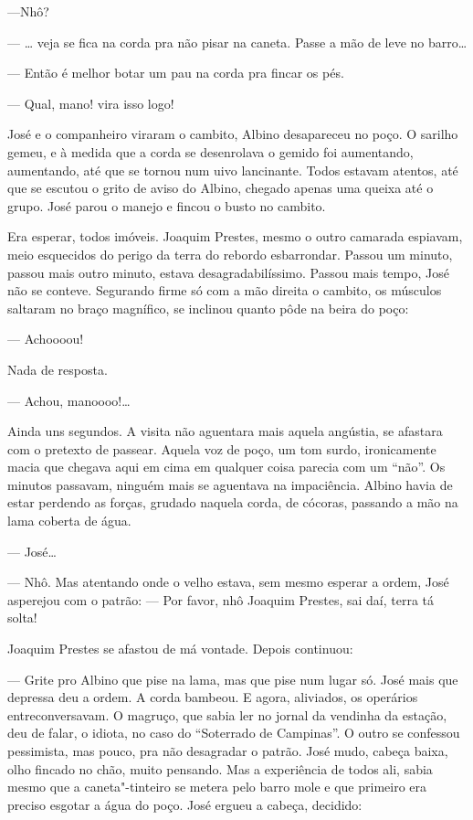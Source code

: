---Nhô?

--- \ldots{} veja se fica na corda pra não pisar na caneta. Passe a mão de
leve no barro\ldots{}

--- Então é melhor botar um pau na corda pra fincar os pés.

--- Qual, mano! vira isso logo!

José e o companheiro viraram o cambito, Albino desapareceu no poço. O
sarilho gemeu, e à medida que a corda se desenrolava o gemido foi
aumentando, aumentando, até que se tornou num uivo lancinante. Todos
estavam atentos, até que se escutou o grito de aviso do Albino, chegado
apenas uma queixa até o grupo. José parou o manejo e fincou o busto no
cambito.

Era esperar, todos imóveis. Joaquim Prestes, mesmo o outro camarada
espiavam, meio esquecidos do perigo da terra do rebordo esbarrondar.
Passou um minuto, passou mais outro minuto, estava desagradabilíssimo.
Passou mais tempo, José não se conteve. Segurando firme só com a mão
direita o cambito, os músculos saltaram no braço magnífico, se inclinou
quanto pôde na beira do poço:

--- Achoooou!

Nada de resposta.

--- Achou, manoooo!\ldots{}

Ainda uns segundos. A visita não aguentara mais aquela angústia, se
afastara com o pretexto de passear. Aquela voz de poço, um tom surdo,
ironicamente macia que chegava aqui em cima em qualquer coisa parecia
com um ``não''. Os minutos passavam, ninguém mais se aguentava na
impaciência. Albino havia de estar perdendo as forças, grudado naquela
corda, de cócoras, passando a mão na lama coberta de água.

--- José\ldots{}

--- Nhô. Mas atentando onde o velho estava, sem mesmo esperar a ordem,
José asperejou com o patrão: --- Por favor, nhô Joaquim Prestes, sai
daí, terra tá solta!

Joaquim Prestes se afastou de má vontade. Depois continuou:

--- Grite pro Albino que pise na lama, mas que pise num lugar só. José
mais que depressa deu a ordem. A corda bambeou. E agora, aliviados, os
operários entreconversavam. O magruço, que sabia ler no jornal da
vendinha da estação, deu de falar, o idiota, no caso do ``Soterrado de
Campinas''. O outro se confessou pessimista, mas pouco, pra não
desagradar o patrão. José mudo, cabeça baixa, olho fincado no chão,
muito pensando. Mas a experiência de todos ali, sabia mesmo que a
caneta"-tinteiro se metera pelo barro mole e que primeiro era preciso
esgotar a água do poço. José ergueu a cabeça, decidido:

